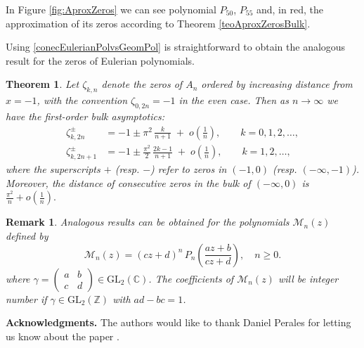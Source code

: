 \documentclass[11pt]{article}
\newtheorem{rem}{Remark}
\newtheorem{theo}{Theorem}
\newcommand{\Z}{\mathbb{Z}}
\newcommand{\C}{\mathbb{C}}
\begin{document}
In Figure \ref{fig:AproxZeros} we can see polynomial $P_{50}$, $P_{55}$ and, in red, the approximation of its zeros  according to Theorem \ref{teoAproxZerosBulk}.

Using \eqref{conecEulerianPolvsGeomPol} is straightforward to obtain  the analogous result for the zeros of Eulerian polynomials.

\begin{theo}
\label{thm:bulk-Eulerian}
Let $\zeta_{k,n}$ denote the zeros of $A_n$ ordered by increasing distance from $x=-1$, with the convention $\zeta_{0,2n}=-1$ in the even case. Then as $n\to\infty$ we have the first-order bulk asymptotics:
\begin{align}
  \zeta_{k,2n}^{\pm} &= -1 \pm \pi^2\,\frac{k}{n+1} \; +\; o\!\left(\frac1n\right),\qquad k=0,1,2,\ldots, \label{eq:A-even}
  \\
 \zeta_{k,2n+1}^{\pm} &= -1 \pm \frac{\pi^2}{2}\,\frac{2k-1}{n+1} \; +\; o\!\left(\frac1n\right),\qquad k=1,2,\ldots, \label{eq:A-odd}
\end{align}
where the superscripts $+$ (resp. $-$) refer to zeros in $(-1,0)$ (resp. $(-\infty,-1)$). Moreover, the distance of consecutive zeros in the bulk of $(-\infty,0)$ is
$ \frac{\pi^2}{n} + o\!\left(\frac1n\right).$
\end{theo}

\begin{rem} Analogous results can be obtained  for the polynomials $\mathcal{M}_n(z)$ defined by
\[
 \mathcal{M}_n(z)=(cz+d)^n\,P_n\!\left(\frac{az+b}{cz+d}\right),\quad n\ge0.
\]
where $\gamma=\begin{pmatrix}a&b\\ c&d\end{pmatrix}\in\mathrm{GL}_2(\C)$. The coefficients of $\mathcal{M}_n(z)$ will be integer number if $\gamma\in\mathrm{GL}_2(\Z)$ with $ad-bc=1$.

\end{rem}

\textbf{Acknowledgments.} The authors would like to thank Daniel Perales for letting us know about the paper \cite{JalKabMar}.
\end{document}
